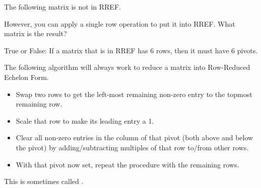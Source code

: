 \edXsolution{  }

\endedxproblem




The following matrix is not in RREF.


However, you can apply a single row operation to put it into RREF.  What matrix is the
result?  




\edXsolution{  }

\endedxproblem




True or False: If a matrix that is in RREF has 6 rows, then it must have 6 pivots.  



\edXsolution{  }

\endedxproblem

\endedxvertical








The following algorithm will always work to reduce a matrix into Row-Reduced Echelon Form.  

\begin{itemize}
\item Swap two rows to get the left-most remaining non-zero entry to the topmost remaining row.  
\item Scale that row to make its leading entry a 1.    
\item Clear all non-zero entries in the column of that pivot (both above and below the pivot) by adding/subtracting multiples of that row to/from other rows.  
\item With that pivot now set, repeat the procedure with the remaining rows.  
\end{itemize}

\endedxtext

This is sometimes called {}.  

\endedxvertical




